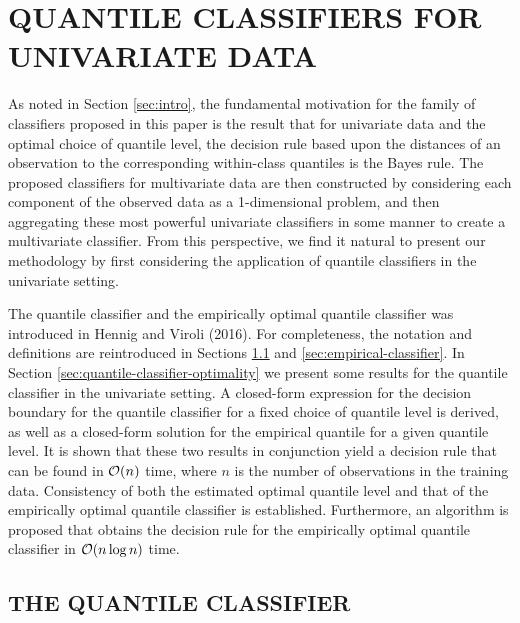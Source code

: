 
\section{QUANTILE CLASSIFIERS FOR UNIVARIATE DATA}
\label{sec:univariate-classifier}

As noted in Section \ref{sec:intro}, the fundamental motivation for the family
of classifiers proposed in this paper is the result that for univariate data and
the optimal choice of quantile level, the decision rule based upon the distances
of an observation to the corresponding within-class quantiles is the Bayes rule.
The proposed classifiers for multivariate data are then constructed by
considering each component of the observed data as a 1-dimensional problem, and
then aggregating these most powerful univariate classifiers in some manner to
create a multivariate classifier.  From this perspective, we find it natural to
present our methodology by first considering the application of quantile
classifiers in the univariate setting.

The quantile classifier and the empirically optimal quantile classifier was
introduced in Hennig and Viroli (2016).  For completeness, the notation and
definitions are reintroduced in Sections \ref{sec:quantile-classifier} and
\ref{sec:empirical-classifier}.  In Section
\ref{sec:quantile-classifier-optimality} we present some results for the
quantile classifier in the univariate setting.  A closed-form expression for the
decision boundary for the quantile classifier for a fixed choice of quantile
level is derived, as well as a closed-form solution for the empirical quantile
for a given quantile level.  It is shown that these two results in conjunction
yield a decision rule that can be found in $\mathcal{O}(n)$ time, where $n$ is the
number of observations in the training data.  Consistency of both the estimated
optimal quantile level and that of the empirically optimal quantile classifier
is established.  Furthermore, an algorithm is proposed that obtains the decision
rule for the empirically optimal quantile classifier in $\mathcal{O}(n \log n)$ time.




\subsection{THE QUANTILE CLASSIFIER}
\label{sec:quantile-classifier}

